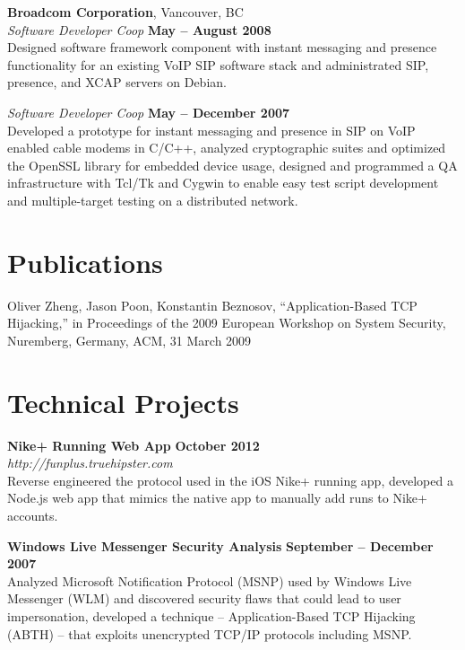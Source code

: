 \documentclass[margin,line]{resume}
\begin{document}
\begin{resume}
	\textbf{Broadcom Corporation}, Vancouver, BC \vspace{2mm}\\\vspace{1mm}%
	\textsl{Software Developer Coop} \hfill
	\textbf{May -- August 2008}\\
	Designed software framework component with instant messaging and presence
	functionality for an existing VoIP SIP software stack and administrated SIP,
	presence, and XCAP servers on Debian.

	\textsl{Software Developer Coop} \hfill
	\textbf{May -- December 2007}\\
	Developed a prototype for instant messaging and presence in SIP on VoIP
	enabled cable modems in C/C++, analyzed cryptographic suites and
	optimized the OpenSSL library for embedded device usage, designed and
	programmed a QA infrastructure with Tcl/Tk and Cygwin to enable easy test
	script development and multiple-target testing on a distributed network.

	\section{\mysidestyle Publications}

	Oliver Zheng, Jason Poon, Konstantin Beznosov, ``Application-Based TCP
	Hijacking,'' in Proceedings of the 2009 European Workshop on System
	Security, Nuremberg, Germany, ACM, 31 March 2009

	\section{\mysidestyle Technical Projects}
	\textbf{Nike+ Running Web App} \hfill
		\textbf{October 2012} \vspace{2mm}\\\vspace{1mm}%
	\textsl{http://funplus.truehipster.com}
		\vspace{1mm}\\
	Reverse engineered the protocol used in the iOS Nike+ running app, developed
	a Node.js web app that mimics the native app to manually add runs to Nike+
	accounts.

	\textbf{Windows Live Messenger Security Analysis} \hfill
	\textbf{September -- December 2007} \vspace{2mm}\\\vspace{1mm}%
	Analyzed Microsoft Notification Protocol (MSNP) used by Windows Live
	Messenger (WLM) and discovered security flaws that could lead to user
	impersonation, developed a technique -- Application-Based TCP Hijacking
	(ABTH) -- that exploits unencrypted TCP/IP protocols including MSNP.


\end{resume}
\end{document}
